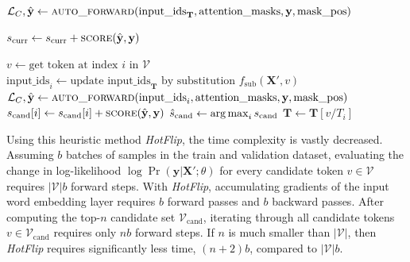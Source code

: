 \begin{algorithm}
\begin{algorithmic}[1]
    \State $\mathcal{L}_C, \hat{\textbf{y}} \gets \Call{\text{auto\_forward}}{\text{input\_ids}_{\textbf{T}} , \text{attention\_masks}, \textbf{y}, \text{mask\_pos}}$
    
    \State $s_{\text{curr}} \gets s_{\text{curr}} + \Call{score}{\hat{\textbf{y}}, \textbf{y}}$
    {\color{mylightgrey}}
    
    {\color{mylightgrey}}
        \State $v \gets \text{get token at index $i$ in $\mathcal{V}$}$
        {\color{mylightgrey}}
        \State $\text{input\_ids}_{i} \gets \text{update $\text{input\_ids}_{\textbf{T}}$ by substitution $f_\text{sub}(\textbf{X}', v)$}$
        \State $\mathcal{L}_C, \hat{\textbf{y}} \gets \Call{\text{auto\_forward}}{\text{input\_ids}_{i}, \text{attention\_masks}, \textbf{y}, \text{mask\_pos}}$
        \State $s_{\text{cand}}[i] \gets s_{\text{cand}}[i] + \Call{score}{\hat{\textbf{y}}, \textbf{y}}$
        {\color{mylightgrey}}
    \EndFor
    \State $\hat{s}_{\text{cand}} \gets \operatorname*{arg\,max}_{i} s_{\text{cand}}$ {\color{mylightgrey}}
        \State $\textbf{T} \gets \textbf{T}[v/T_i]$
        {\color{mylightgrey}}
    \EndIf
\EndFor
\EndFunction
\end{algorithmic}
\end{algorithm}

Using this heuristic method \textit{HotFlip}, the time complexity is vastly decreased. Assuming $b$ batches of samples in the train and validation dataset, evaluating the change in log-likelihood $\log\Pr(\textbf{y}| \textbf{X}' ; \theta)$ for every candidate token $v \in \mathcal{V}$ requires $|\mathcal{V}|b$ forward steps. With \textit{HotFlip}, accumulating gradients of the input word embedding layer requires $b$ forward passes and $b$ backward passes. After computing the top-$n$ candidate set $\mathcal{V}_{\text{cand}}$, iterating through all candidate tokens $v \in \mathcal{V}_{\text{cand}}$ requires only $nb$ forward steps. If $n$ is much smaller than $|\mathcal{V}|$, then \textit{HotFlip} requires significantly less time, $(n+2)b$, compared to $|\mathcal{V}|b$.

